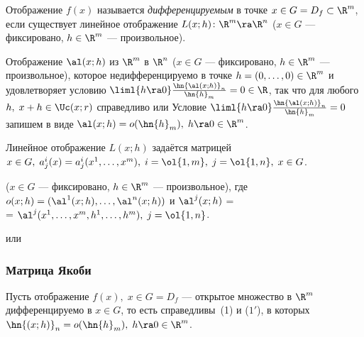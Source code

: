\documentclass[a4paper]{article}
\newcommand{\emd}[1]{\emph{#1}}
\begin{document}
\begin{df}
Отображение $f(x)$ называется \emd{дифференцируемым} в
точке $x\in G=D_f\subset \R^m$, если существует линейное отображение
$L(x;h)\colon \R^m \ra \R^n$ ($x\in G$ --- фиксировано, $h\in\R^m$
--- произвольное).
\end{df}

Отображение $\al(x;h)$ из $\R^m$ в $\R^n$ ($x\in G$ --- фиксировано,
$h\in\R^m$ --- произвольное), которое недифференцируемо в точке
$h=(0,\ldots,0)\in\R^m$ и удовлетворяет условию $\liml{h\ra0}
\frac{\hn{\al(x;h)}_n}{\hn{h}_m}=0 \in \R$, так что для любого $h,
\; x+h\in \Uc(x;r)$ справедливо  или  Условие $\liml{h\ra0}
\frac{\hn{\al(x;h)}_n}{\hn{h}_m}=0$ запишем в виде
$\al(x;h)=o(\hn{h}_m), \; h\ra0\in\R^m$.

Линейное отображение $L(x;h)$ задаётся матрицей  $x\in G, \; a_j^i(x) = a_j^i(x^1,\ldots,x^m), \;
i=\ol{1,m}, \; j=\ol{1,n}, \; x\in G$.

 ($x\in G$
--- фиксировано, $h\in\R^m$ --- произвольное), где $o(x;h) =
(\al^1(x;h), \ldots, \al^n(x;h))$ и $\al^j(x;h)$ = \\ =
$\al^j(x^1,\ldots,x^m,h^1,\ldots,h^m), \; j=\ol{1,n}$.

 или 

\subsubsection{ Матрица Якоби}

Пусть отображение $f(x), \; x\in G=D_f$ --- открытое множество в
$\R^m$ дифференцируемо в $x\in G$, то есть справедливы~(1) и ($1'$),
в которых $\hn{(x;h)}_n=o(\hn{h}_m), \; h\ra0 \in \R^m$.
\end{document}
